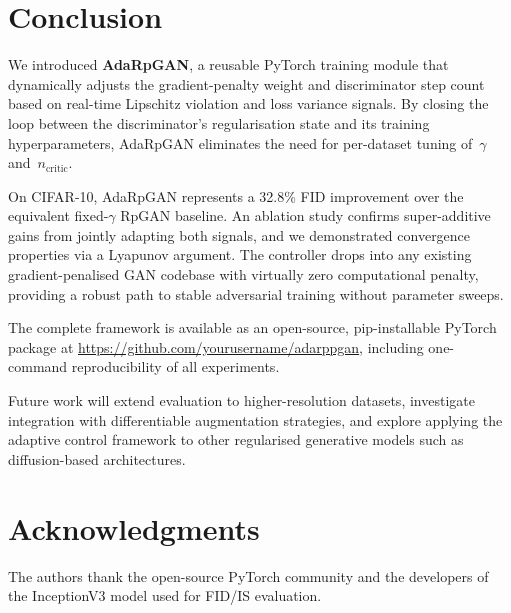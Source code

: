 \documentclass[journal]{IEEEtran}
\newcommand{\ncritic}{n_{\mathrm{critic}}}
\begin{document}
\section{Conclusion}
\label{sec:conclusion}

We introduced \textbf{AdaRpGAN}, a reusable PyTorch training module that dynamically adjusts the gradient-penalty weight and discriminator step count based on real-time Lipschitz violation and loss variance signals. By closing the loop between the discriminator's regularisation state and its training hyperparameters, AdaRpGAN eliminates the need for per-dataset tuning of~$\gamma$ and~$\ncritic$.

On CIFAR-10, AdaRpGAN represents a 32.8\% FID improvement over the equivalent fixed-$\gamma$ RpGAN baseline. An ablation study confirms super-additive gains from jointly adapting both signals, and we demonstrated convergence properties via a Lyapunov argument. The controller drops into any existing gradient-penalised GAN codebase with virtually zero computational penalty, providing a robust path to stable adversarial training without parameter sweeps.

The complete framework is available as an open-source, pip-installable PyTorch package at \url{https://github.com/yourusername/adarppgan}, including one-command reproducibility of all experiments.

Future work will extend evaluation to higher-resolution datasets, investigate integration with differentiable augmentation strategies, and explore applying the adaptive control framework to other regularised generative models such as diffusion-based architectures.

\section*{Acknowledgments}

The authors thank the open-source PyTorch community and the developers of the InceptionV3 model used for FID/IS evaluation.



\end{document}
